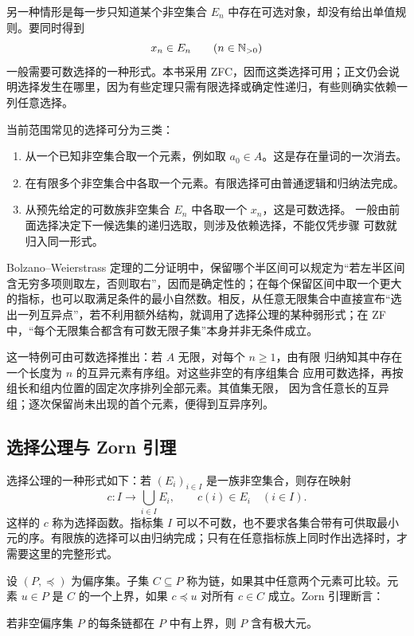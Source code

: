 另一种情形是每一步只知道某个非空集合 \(E_n\) 中存在可选对象，却没有给出单值规则。要同时得到
\[
 x_n\in E_n\qquad(n\in\mathbb{N}_{>0})
\]
一般需要可数选择的一种形式。本书采用 ZFC，因而这类选择可用；正文仍会说明选择发生在哪里，因为有些定理只需有限选择或确定性递归，有些则确实依赖一列任意选择。

当前范围常见的选择可分为三类：
\begin{enumerate}
 \item 从一个已知非空集合取一个元素，例如取 \(a_0\in A\)。这是存在量词的一次消去。
 \item 在有限多个非空集合中各取一个元素。有限选择可由普通逻辑和归纳法完成。
 \item 从预先给定的可数族非空集合 \(E_n\) 中各取一个 \(x_n\)，这是可数选择。
 一般由前面选择决定下一候选集的递归选取，则涉及依赖选择，不能仅凭步骤
 可数就归入同一形式。
\end{enumerate}

Bolzano--Weierstrass 定理的二分证明中，保留哪个半区间可以规定为“若左半区间含无穷多项则取左，否则取右”，因而是确定性的；在每个保留区间中取一个更大的指标，也可以取满足条件的最小自然数。相反，从任意无限集合中直接宣布“选出一列互异点”，若不利用额外结构，就调用了选择公理的某种弱形式；在 ZF 中，“每个无限集合都含有可数无限子集”本身并非无条件成立。

这一特例可由可数选择推出：若 \(A\) 无限，对每个 \(n\geq1\)，由有限
归纳知其中存在一个长度为 \(n\) 的互异元素有序组。对这些非空的有序组集合
应用可数选择，再按组长和组内位置的固定次序排列全部元素。其值集无限，
因为含任意长的互异组；逐次保留尚未出现的首个元素，便得到互异序列。

\subsection{选择公理与 Zorn 引理}

选择公理的一种形式如下：若 \((E_i)_{i\in I}\) 是一族非空集合，则存在映射
\[
 c:I\longrightarrow\bigcup_{i\in I}E_i,
 \qquad c(i)\in E_i\quad(i\in I).
\]
这样的 \(c\) 称为选择函数。指标集 \(I\) 可以不可数，也不要求各集合带有可供取最小元的序。有限族的选择可以由归纳完成；只有在任意指标族上同时作出选择时，才需要这里的完整形式。

设 \((P,\preccurlyeq)\) 为偏序集。子集 \(C\subseteq P\) 称为链，如果其中任意两个元素可比较。元素 \(u\in P\) 是 \(C\) 的一个上界，如果 \(c\preccurlyeq u\) 对所有 \(c\in C\) 成立。Zorn 引理断言：

\begin{theorem}[Zorn 引理]
若非空偏序集 \(P\) 的每条链都在 \(P\) 中有上界，则 \(P\) 含有极大元。
\end{theorem}

